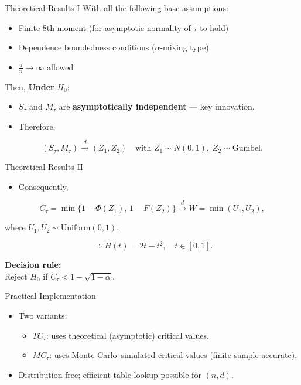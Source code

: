 \documentclass[
  ignorenonframetext,
]{beamer}
\providecommand{\tightlist}{%
  \setlength{\itemsep}{0pt}\setlength{\parskip}{0pt}}
\begin{document}
\begin{frame}{Theoretical Results I}
\label{theoretical-results-i}
With all the following base assumptions:

\begin{itemize}
\tightlist
\item
  Finite 8th moment (for asymptotic normality of \(\tau\) to hold)
\item
  Dependence boundedness conditions (\(\alpha\)-mixing type)
\item
  \(\frac{d}{n} \rightarrow \infty\) allowed
\end{itemize}

Then, \textbf{Under} \(H_0\):

\begin{itemize}
\tightlist
\item
  \(S_\tau\) and \(M_\tau\) are \textbf{asymptotically independent} ---
  key innovation.
\item
  Therefore,
\end{itemize}

\[
(S_\tau, M_\tau) \xrightarrow{d} (Z_1, Z_2)
\quad \text{with } Z_1\sim N(0,1),\; Z_2\sim \text{Gumbel}.
\]
\end{frame}

\begin{frame}{Theoretical Results II}
\label{theoretical-results-ii}
\begin{itemize}
\tightlist
\item
  Consequently,
\end{itemize}

\[
C_\tau = \min\{1 - \Phi(Z_1),\, 1 - F(Z_2)\} \xrightarrow{d} W=\min(U_1,U_2),
\]

where \(U_1,U_2\sim \text{Uniform}(0,1)\).

\[
\Rightarrow H(t) = 2t - t^2,\quad t\in[0,1].
\]

\textbf{Decision rule:}\\
Reject \(H_0\) if \(C_\tau < 1 - \sqrt{1 - \alpha}\).
\end{frame}

\begin{frame}{Practical Implementation}
\label{practical-implementation}
\begin{itemize}
\tightlist
\item
  Two variants:

  \begin{itemize}
  \tightlist
  \item
    \(TC_\tau\): uses theoretical (asymptotic) critical values.\\
  \item
    \(MC_\tau\): uses Monte Carlo--simulated critical values
    (finite-sample accurate).\\
  \end{itemize}
\item
  Distribution-free; efficient table lookup possible for \((n,d)\).
\end{itemize}
\end{frame}
\end{document}
